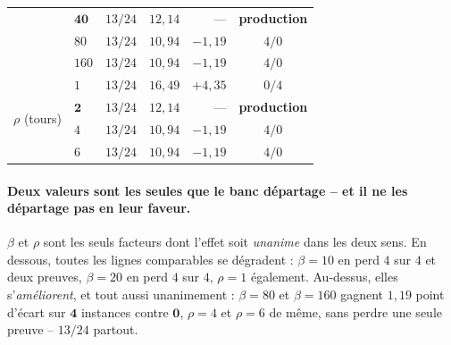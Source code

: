 \documentclass[11pt,a4paper]{article}
\theoremstyle{plain}
\theoremstyle{remark}
\begin{document}
\begin{table}[H]
\begin{tabular}{llrrrc}
 & $\mathbf{40}$ & $13/24$ & $12{,}14$ & --- & \textbf{production}\\
 & $80$ & $13/24$ & $10{,}94$ & $-1{,}19$ & $4/0$\\
 & $160$ & $13/24$ & $10{,}94$ & $-1{,}19$ & $4/0$\\
\midrule
\multirow{4}{*}{$\rho$ (tours)}
 & $1$ & $13/24$ & $16{,}49$ & $+4{,}35$ & $0/4$\\
 & $\mathbf{2}$ & $13/24$ & $12{,}14$ & --- & \textbf{production}\\
 & $4$ & $13/24$ & $10{,}94$ & $-1{,}19$ & $4/0$\\
 & $6$ & $13/24$ & $10{,}94$ & $-1{,}19$ & $4/0$\\
\bottomrule
\end{tabular}
\end{table}

\paragraph{Deux valeurs sont les seules que le banc départage -- et il ne
les départage pas en leur faveur.} $\beta$ et $\rho$ sont les seuls
facteurs dont l'effet soit \emph{unanime} dans les deux sens. En dessous,
toutes les lignes comparables se dégradent : $\beta=10$ en perd $4$ sur
$4$ et deux preuves, $\beta=20$ en perd $4$ sur $4$, $\rho=1$ également.
Au-dessus, elles s'\emph{améliorent}, et tout aussi unanimement :
$\beta=80$ et $\beta=160$ gagnent $1{,}19$ point d'écart sur
$\mathbf{4}$ instances contre $\mathbf{0}$, $\rho=4$ et $\rho=6$ de même,
sans perdre une seule preuve -- $13/24$ partout.
\end{document}

